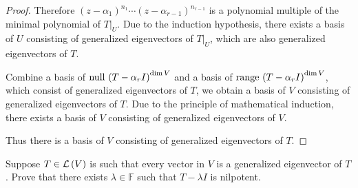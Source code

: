 \begin{proof}
    Therefore ${(z - \alpha_{1})}^{n_{1}}\cdots {(z - \alpha_{r-1})}^{n_{r-1}}$ is a polynomial multiple of the minimal polynomial of $T\vert_{U}$. Due to the induction hypothesis, there exists a basis of $U$ consisting of generalized eigenvectors of $T\vert_{U}$, which are also generalized eigenvectors of $T$.

    Combine a basis of $\operatorname{null}\,{{(T - \alpha_{r}I)}^{\dim V}}$ and a basis of $\operatorname{range}\,{{(T - \alpha_{r}I)}^{\dim V}}$, which consist of generalized eigenvectors of $T$, we obtain a basis of $V$ consisting of generalized eigenvectors of $T$. Due to the principle of mathematical induction, there exists a basis of $V$ consisting of generalized eigenvectors of $V$.

    Thus there is a basis of $V$ consisting of generalized eigenvectors of $T$.
\end{proof}

\newpage

\begin{exercise}\label{chapter8:sectionA:exercise12}
    Suppose $T\in\mathcal{L}\left({V}\right)$ is such that every vector in $V$ is a generalized eigenvector of $T$. Prove that there exists $\lambda\in\mathbb{F}$ such that $T - \lambda I$ is nilpotent.
\end{exercise}

